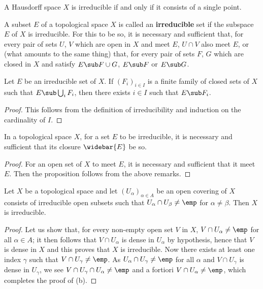 \begin{example}
A Hausdorff space $X$ is irreducible if and only if it consists of a single point.
\end{example}
A subset $E$ of a topological space $X$ is called an \textbf{irreducible} set if the subspace $E$ of $X$ is irreducible. For this to be so, it is necessary and sufficient that, for every pair of sets $U$, $V$ which are open in $X$ and meet $E$, $U\cap V$ also meet $E$, or (what amounts to the same thing) that, for every pair of sets $F$, $G$ which are closed in $X$ and satisfy $E\sub F\cup G$, $E\sub F$ or $E\sub G$. 
\begin{proposition}\label{topo space irreducible contained in finite union}
Let $E$ be an irreducible set of $X$. If $(F_i)_{i\in I}$ is a finite family of closed sets of $X$ such that $E\sub\bigcup_iF_i$, then there exists $i\in I$ such that $E\sub F_i$.
\end{proposition}
\begin{proof}
This follows from the definition of irreducibility and induction on the cardinality of $I$.
\end{proof}
\begin{proposition}\label{topological subspace irreducible iff closure}
In a topological space $X$, for a set $E$ to be irreducible, it is necessary and sufficient that its closure $\widebar{E}$ be so.
\end{proposition}
\begin{proof}
For an open set of $X$ to meet $E$, it is necessary and sufficient that it meet $E$. Then the proposition follows from the above remarks.
\end{proof}
\begin{proposition}\label{topo space open cover of irreducible is irreducible if}
Let $X$ be a topological space and let $(U_\alpha)_{\alpha\in A}$ be an open covering of $X$ consists of irreducible open subsets such that $U_\alpha\cap U_\beta\neq\emp$ for $\alpha\neq\beta$. Then $X$ is irreducible.
\end{proposition}
\begin{proof}
Let us show that, for every non-empty open set $V$ in $X$, $V\cap U_\alpha\neq\emp$ for all $\alpha\in A$; it then follows that $V\cap U_\alpha$ is dense in $U_\alpha$ by hypothesis, hence that $V$ is dense in $X$ and this proves that $X$ is irreducible. Now there exists at least one index $\gamma$ such that $V\cap U_\gamma\neq\emp$. As $U_\alpha\cap U_\gamma\neq\emp$ for all $\alpha$ and $V\cap U_\gamma$ is dense in $U_\gamma$, we see $V\cap U_\gamma\cap U_\alpha\neq\emp$ and a fortiori $V\cap U_\alpha\neq\emp$, which completes the proof of (b).
\end{proof}
